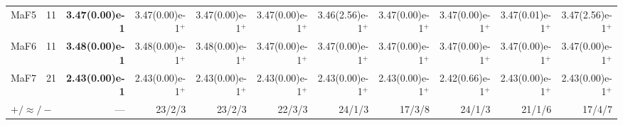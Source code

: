 \documentclass[pdflatex,sn-mathphys-ay]{sn-jnl}%
\theoremstyle{thmstyleone}%
\theoremstyle{thmstyletwo}%
\theoremstyle{thmstylethree}%
\begin{document}
\begin{landscape}
{\begin{longtable}{llrrrrrrrrr}
			MaF5                              & 11  & \textbf{3.47(0.00)e-1} & 3.47(0.00)e-1$^{+}$                & 3.47(0.00)e-1$^{+}$          & 3.47(0.00)e-1$^{+}$       & 3.46(2.56)e-1$^{+}$          & 3.47(0.00)e-1$^{+}$                & 3.47(0.00)e-1$^{+}$          & 3.47(0.01)e-1$^{+}$          & 3.47(2.56)e-1$^{+}$       \\
			MaF6                              & 11  & \textbf{3.48(0.00)e-1} & 3.48(0.00)e-1$^{+}$                & 3.48(0.00)e-1$^{+}$          & 3.47(0.00)e-1$^{+}$       & 3.47(0.00)e-1$^{+}$          & 3.47(0.00)e-1$^{+}$                & 3.47(0.00)e-1$^{+}$          & 3.47(0.00)e-1$^{+}$          & 3.47(0.00)e-1$^{+}$       \\
			MaF7                              & 21  & \textbf{2.43(0.00)e-1} & 2.43(0.00)e-1$^{+}$                & 2.43(0.00)e-1$^{+}$          & 2.43(0.00)e-1$^{+}$       & 2.43(0.00)e-1$^{+}$          & 2.43(0.00)e-1$^{+}$                & 2.42(0.66)e-1$^{+}$          & 2.43(0.00)e-1$^{+}$          & 2.43(0.00)e-1$^{+}$       \\
			\midrule
			\multicolumn{2}{l}{$+/\approx/-$} & --- & 23/2/3                 & 23/2/3                             & 22/3/3                       & 24/1/3                    & 17/3/8                       & 24/1/3                             & 21/1/6                       & 17/4/7                                                   \\
		\end{longtable}
	}
\end{landscape}
\end{document}
